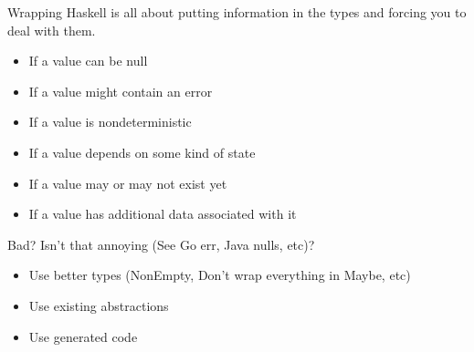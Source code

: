 \documentclass[10pt]{beamer}
\begin{document}
\begin{frame}[fragile]{Wrapping}
  Haskell is all about putting information in the types and forcing you to deal
  with them.
  \begin{itemize}
    \item If a value can be null
    \item If a value might contain an error
    \item If a value is nondeterministic
    \item If a value depends on some kind of state
    \item If a value may or may not exist yet
    \item If a value has additional data associated with it
  \end{itemize}
\end{frame}

\begin{frame}[fragile]{Bad?}
  Isn't that annoying (See Go err, Java nulls, etc)?
  \pause
  \begin{itemize}
    \item Use better types (NonEmpty, Don't wrap everything in Maybe, etc)
    \item Use existing abstractions
    \item Use generated code
  \end{itemize}
\end{frame}
\end{document}
